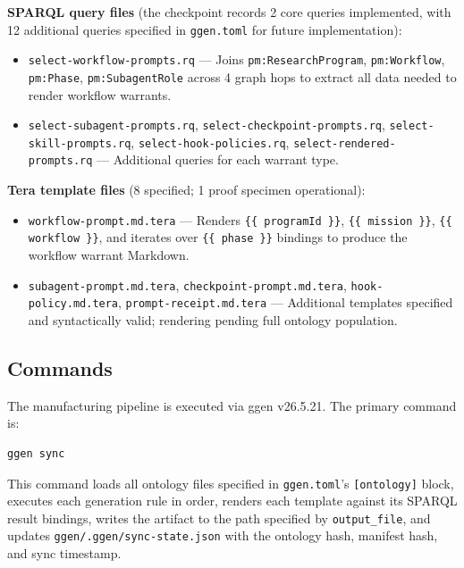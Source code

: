 \textbf{SPARQL query files} (the checkpoint records 2 core queries implemented, with
12 additional queries specified in \texttt{ggen.toml} for future implementation):
\begin{itemize}
  \item \texttt{select-workflow-prompts.rq} --- Joins \texttt{pm:ResearchProgram},
    \texttt{pm:Workflow}, \texttt{pm:Phase}, \texttt{pm:SubagentRole} across 4 graph hops
    to extract all data needed to render workflow warrants.
  \item \texttt{select-subagent-prompts.rq}, \texttt{select-checkpoint-prompts.rq},
    \texttt{select-skill-prompts.rq}, \texttt{select-hook-policies.rq},
    \texttt{select-rendered-prompts.rq} --- Additional queries for each warrant type.
\end{itemize}

\textbf{Tera template files} (8 specified; 1 proof specimen operational):
\begin{itemize}
  \item \texttt{workflow-prompt.md.tera} --- Renders \texttt{\{\{ programId \}\}},
    \texttt{\{\{ mission \}\}}, \texttt{\{\{ workflow \}\}}, and iterates over
    \texttt{\{\{ phase \}\}} bindings to produce the workflow warrant Markdown.
  \item \texttt{subagent-prompt.md.tera}, \texttt{checkpoint-prompt.md.tera},
    \texttt{hook-policy.md.tera}, \texttt{prompt-receipt.md.tera} --- Additional templates
    specified and syntactically valid; rendering pending full ontology population.
\end{itemize}

\subsection{Commands}
\label{sec:research-prompt-manufactory-implementation-commands}

The manufacturing pipeline is executed via ggen v26.5.21. The primary command is:

\begin{verbatim}
ggen sync
\end{verbatim}

This command loads all ontology files specified in \texttt{ggen.toml}'s
\texttt{[ontology]} block, executes each generation rule in order, renders each
template against its SPARQL result bindings, writes the artifact to the path
specified by \texttt{output\_file}, and updates
\texttt{ggen/.ggen/sync-state.json} with the ontology hash, manifest hash,
and sync timestamp.

